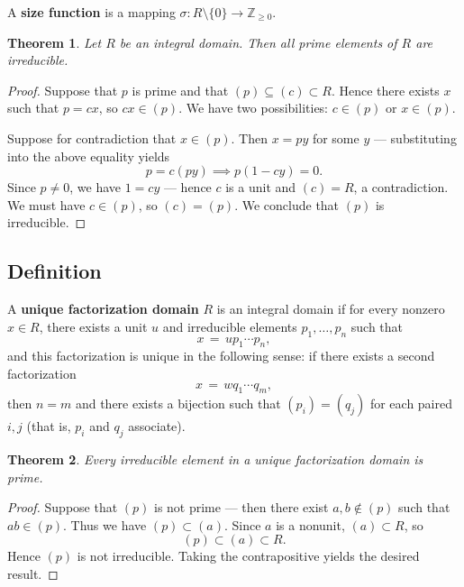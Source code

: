 \documentclass[11pt]{article}
\newtheorem{theorem}{Theorem}
\begin{document}
A \textbf{size function} is a mapping $\sigma : R \setminus \{ 0 \} \to \mathbb{Z}_{\ge 0}$.

\begin{adjustwidth}{0.5cm}{}
  \begin{theorem}
    Let $R$ be an integral domain. Then all prime elements of $R$ are irreducible.
  \end{theorem}
  \begin{proof}
    Suppose that $p$ is prime and that $(p) \subseteq (c) \subset R$. Hence there exists $x$ such that $p = cx$, so $cx \in (p)$. We have two possibilities: $c \in (p)$ or $x \in (p)$.

    Suppose for contradiction that $x \in (p)$. Then $x = py$ for some $y$ --- substituting into the above equality yields
    \[
      p = c(py) \implies p(1 - cy) = 0.
    \]
    Since $p \ne 0$, we have $1 = cy$ --- hence $c$ is a unit and $(c) = R$, a contradiction. We must have $c \in (p)$, so $(c) = (p)$. We conclude that $(p)$ is irreducible.
  \end{proof}
\end{adjustwidth}




\subsection{Definition}

A \textbf{unique factorization domain} $R$ is an integral domain if for every nonzero $x \in R$, there exists a unit $u$ and irreducible elements $p_{1}, \ldots, p_{n}$ such that
\[
  x \, = \, u p_{1} \cdots p_{n},
\]
and this factorization is unique in the following sense: if there exists a second factorization
\[
  x \, = \, w q_{1} \cdots q_{m},
\]
then $n = m$ and there exists a bijection such that $(p_{i}) = (q_{j})$ for each paired $i, j$ (that is, $p_{i}$ and $q_{j}$ associate).

\begin{adjustwidth}{0.5cm}{}
  \begin{theorem}
    Every irreducible element in a unique factorization domain is prime.
  \end{theorem}
  \begin{proof}
    Suppose that $(p)$ is not prime --- then there exist $a, b \notin (p)$ such that $ab \in (p)$. Thus we have $(p) \subset (a)$. Since $a$ is a nonunit, $(a) \subset R$, so
    \[
      (p) \subset (a) \subset R.
    \]
    Hence $(p)$ is not irreducible. Taking the contrapositive yields the desired result.
  \end{proof}
\end{adjustwidth}
\end{document}
